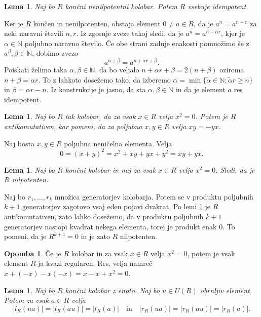 \documentclass[a4paper, 12pt]{amsart}
\theoremstyle{definition} %
\newtheorem{opomba}[definicija]{Opomba}
\theoremstyle{plain} %
\newtheorem{lema}[definicija]{Lema}
\newcommand{\N}{\mathbb N}
\begin{document}
\begin{lema}
\label{idempotent}
Naj bo $R$ končni nenilpotentni kolobar. Potem $R$ vsebuje idempotent.
\end{lema}

\proof
Ker je $R$ končen in nenilpotenten, obstaja element $0\neq a\in R$, da je $a^n = a^{n+r}$ za neki naravni števili $n,r$. Iz zgornje zveze takoj sledi, da je $a^n = a^{n+ \alpha r}$, kjer je $\alpha \in \N$ poljubno naravno število. Če obe strani zadnje enakosti pomnožimo še z $a^\beta, \beta \in \N$, dobimo zvezo
$$
a^{n+\beta} = a^{n+\alpha r +\beta}.
$$ 
Poiskati želimo taka $\alpha,\beta \in \N$, da bo veljalo $n+ \alpha r +\beta = 2(n+ \beta)$ oziroma $n+ \beta = \alpha r$. To z lahkoto dosežemo tako, da izberemo $ \alpha = \min\{\tilde{\alpha} \in \N; \tilde{\alpha} r \ge n \}$ in $\beta = \alpha r - n$. Iz konstrukcije je jasno, da sta $\alpha, \beta \in \N$ in da je element $a$ res idempotent.
\endproof

\begin{lema}
\label{antikomutativnost}
Naj bo $R$ tak kolobar, da za vsak $x\in R$ velja $x^2 =0 $. Potem je $R$ antikomutativen, kar pomeni, da za poljubna $x,y\in R$ velja $xy = -yx$.
\end{lema}

\proof
Naj bosta $x,y\in R$ poljubna neničelna elementa. Velja 
$$
0 = (x+y)^2 = x^2 + xy + yx + y^2 = xy + yx.
$$ 
\endproof

\begin{lema}
\label{nilpotenten}
Naj bo $R$ končni kolobar in naj za vsak $x\in R$ velja $x^2 = 0$. Sledi, da je $R$ nilpotenten.
\end{lema}

\proof
Naj bo $r_1, \dots, r_k$ množica generatorjev kolobarja. Potem se v produktu poljubnih $k+1$ generatorjev zagotovo vsaj eden pojavi dvakrat. Po lemi \ref{antikomutativnost} je $R$ antikomutativen, zato lahko dosežemo, da v produktu poljubnih $k+1$ generatorjev nastopi kvadrat nekega elementa, torej je produkt enak 0. To pomeni, da je $R^{k+1} = 0$ in je zato $R$ nilpotenten.  
\endproof

\begin{opomba}
Če je $R$ kolobar in za vsak $x\in R$ velja $x^2 = 0$, potem je vsak element $R$-ja kvazi regularen. Res, velja namreč $x+ (-x)  - x(-x) = x-x+x^2 = 0$.
\end{opomba}

\begin{lema}
\label{anihilatorProduktZObrnljivim}
Naj bo $R$ končni kolobar z enoto. Naj bo $u\in U(R)$ obrnljiv element. Potem za vsak $a\in R$ velja 
$$
|l_R(ua)| = |l_R(au)| = |l_R(a)| \quad \text{in}\quad |r_R(ua)| = |r_R(au)| = |r_R(a)|.
$$
\end{lema}
\end{document}
